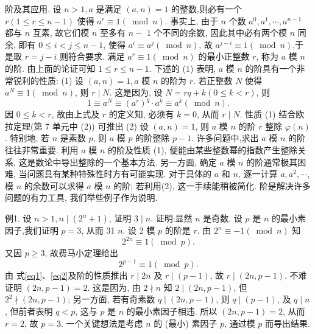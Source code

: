 
阶及其应用.
设 $n>1, a$ 是满足 $(a, n)=1$ 的整数,则必有一个 $r(1 \leqslant r \leqslant n-1)$ 使得 $a^r \equiv 1(\bmod n)$.
事实上, 由于 $n$ 个数 $a^0, a^1, \cdots, a^{n-1}$ 都与 $n$ 互素, 故它们模 $n$ 至多有 $n-$ 1 个不同的余数, 因此其中必有两个模 $n$ 同余, 即有 $0 \leqslant i<j \leqslant n-1$, 使得 $a^i \equiv a^j(\bmod n)$, 故 $a^{j-i} \equiv 1(\bmod n)$,于是取 $r=j-i$ 则符合要求.
满足 $a^r \equiv 1(\bmod n)$ 的最小正整数 $r$, 称为 $a$ 模 $n$ 的阶.
由上面的论证可知 $1 \leqslant r \leqslant n-1$. 下述的 (1) 表明, $a$ 模 $n$ 的阶具有一个非常锐利的性质:
(1) 设 $(a, n)=1, a$ 模 $n$ 的阶为 $r$. 若正整数 $N$ 使得 $a^N \equiv 1(\bmod n)$, 则 $r \mid N$.
这是因为, 设 $N=r q+k(0 \leqslant k<r)$, 则
$$
1 \equiv a^N \equiv\left(a^r\right)^q \cdot a^k \equiv a^k(\bmod n) .
$$
因 $0 \leqslant k<r$, 故由上式及 $r$ 的定义知, 必须有 $k=0$, 从而 $r \mid N$.
性质 (1) 结合欧拉定理(第 7 单元中 (2)) 可推出
(2) 设 $(a, n)=1$, 则 $a$ 模 $n$ 的阶 $r$ 整除 $\varphi(n)$. 特别地, 若 $n$ 是素数 $p$, 则 $a$ 模 $p$ 的阶整除 $p-1$.
许多问题中,求出 $a$ 模 $n$ 的阶往往非常重要.
利用 $a$ 模 $n$ 的阶及性质 (1), 便能由某些整数幂的指数产生整除关系, 这是数论中导出整除的一个基本方法.
另一方面, 确定 $a$ 模 $n$ 的阶通常极其困难, 当问题具有某种特殊性时方有可能实现.
对于具体的 $a$ 和 $n$, 逐一计算 $a, a^2, \cdots$, 模 $n$ 的余数可以求得 $a$ 模 $n$ 的阶; 若利用(2), 这一手续能稍被简化.
阶是解决许多问题的有力工具, 我们举些例子作为说明.



例1. 设 $n>1, n \mid\left(2^n+1\right)$, 证明 $3 \mid n$.
证明:显然 $n$ 是奇数.
设 $p$ 是 $n$ 的最小素因子,我们证明 $p=3$, 从而 31 $n$. 设 2 模 $p$ 的阶是 $r$. 由 $2^n \equiv-1(\bmod n)$ 知
$$
2^{2 n} \equiv 1(\bmod p) . \label{eq1}
$$
又因 $p \geqslant 3$, 故费马小定理给出
$$
2^{p-1} \equiv 1(\bmod p) . \label{eq2}
$$
由 式\ref{eq1}、\ref{eq2}及阶的性质推出 $r \mid 2 n$ 及 $r \mid(p-1)$, 故 $r \mid(2 n, p-1)$. 不难证明 $( 2 n, p-1)=2$. 这是因为, 由 $2 \nmid n$ 知 $2 \mid(2 n, p-1)$, 但 $2^2 \nmid(2 n, p-1)$; 另一方面, 若有奇素数 $q \mid(2 n, p-1)$, 则 $q \mid(p-1)$, 及 $q \mid n$, 但前者表明 $q<p$, 这与 $p$ 是 $n$ 的最小素因子相违.
所以 $(2 n, p-1)=2$, 从而 $r=2$, 故 $p=3$.
一个关键想法是考虑 $n$ 的 (最小) 素因子 $p$, 通过模 $p$ 而导出结果.



